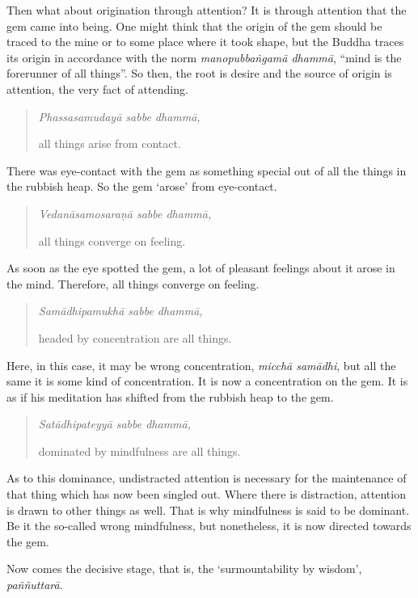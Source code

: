 Then what about origination through attention? It is through attention that the gem came into being. One might think that the origin of the gem should be traced to the mine or to some place where it took shape, but the Buddha traces its origin in accordance with the norm \emph{manopubbaṅgamā dhammā}, ``mind is the forerunner of all things''. So then, the root is desire and the source of origin is attention, the very fact of attending.

\begin{quote}
\emph{Phassasamudayā sabbe dhammā,}

all things arise from contact.
\end{quote}

There was eye-contact with the gem as something special out of all the things in the rubbish heap. So the gem `arose' from eye-contact.

\begin{quote}
\emph{Vedanāsamosaraṇā sabbe dhammā,}

all things converge on feeling.
\end{quote}

As soon as the eye spotted the gem, a lot of pleasant feelings about it arose in the mind. Therefore, all things converge on feeling.

\begin{quote}
\emph{Samādhipamukhā sabbe dhammā,}

headed by concentration are all things.
\end{quote}

Here, in this case, it may be wrong concentration, \emph{micchā samādhi}, but all the same it is some kind of concentration. It is now a concentration on the gem. It is as if his meditation has shifted from the rubbish heap to the gem.

\begin{quote}
\emph{Satādhipateyyā sabbe dhammā,}

dominated by mindfulness are all things.
\end{quote}

As to this dominance, undistracted attention is necessary for the maintenance of that thing which has now been singled out. Where there is distraction, attention is drawn to other things as well. That is why mindfulness is said to be dominant. Be it the so-called wrong mindfulness, but nonetheless, it is now directed towards the gem.

Now comes the decisive stage, that is, the `surmountability by wisdom', \emph{paññuttarā}.

